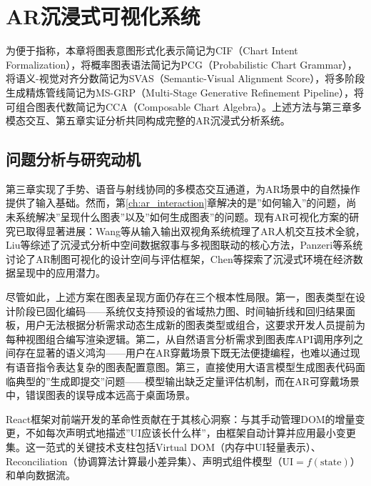 \chapter{AR沉浸式可视化系统}
\label{ch:ar_visualization}

为便于指称，本章将图表意图形式化表示简记为CIF（Chart Intent Formalization），将概率图表语法简记为PCG（Probabilistic Chart Grammar），将语义-视觉对齐分数简记为SVAS（Semantic-Visual Alignment Score），将多阶段生成精炼管线简记为MS-GRP（Multi-Stage Generative Refinement Pipeline），将可组合图表代数简记为CCA（Composable Chart Algebra）。上述方法与第三章多模态交互、第五章实证分析共同构成完整的AR沉浸式分析系统。

\section{问题分析与研究动机}
\label{sec:ch4_motivation}

第三章实现了手势、语音与射线协同的多模态交互通道，为AR场景中的自然操作提供了输入基础。然而，第\ref{ch:ar_interaction}章解决的是”如何输入”的问题，尚未系统解决”呈现什么图表”以及”如何生成图表”的问题。现有AR可视化方案的研究已取得显著进展：Wang等\cite{wang2026ar_io_survey}从输入输出双视角系统梳理了AR人机交互技术全貌，Liu等\cite{Liu_Jia_Nie_Rosenberg_Interrante_Zhu-Tian_2025}综述了沉浸式分析中空间数据叙事与多视图联动的核心方法，Panzeri等\cite{panzeri2026cartographic}系统讨论了AR制图可视化的设计空间与评估框架，Chen等\cite{chen2025immersive_econ}探索了沉浸式环境在经济数据呈现中的应用潜力。

尽管如此，上述方案在图表呈现方面仍存在三个根本性局限。第一，图表类型在设计阶段已固化编码——系统仅支持预设的省域热力图、时间轴折线和回归结果面板，用户无法根据分析需求动态生成新的图表类型或组合，这要求开发人员提前为每种视图组合编写渲染逻辑。第二，从自然语言分析需求到图表库API调用序列之间存在显著的语义鸿沟——用户在AR穿戴场景下既无法便捷编程，也难以通过现有语音指令表达复杂的图表配置意图。第三，直接使用大语言模型生成图表代码面临典型的”生成即提交”问题——模型输出缺乏定量评估机制，而在AR可穿戴场景中，错误图表的误导成本远高于桌面场景。

React框架\cite{walke2013react}对前端开发的革命性贡献在于其核心洞察：与其手动管理DOM的增量变更，不如每次声明式地描述”UI应该长什么样”，由框架自动计算并应用最小变更集。这一范式的关键技术支柱包括Virtual DOM（内存中UI轻量表示）、Reconciliation（协调算法计算最小差异集）、声明式组件模型（$\text{UI} = f(\text{state})$）和单向数据流。

